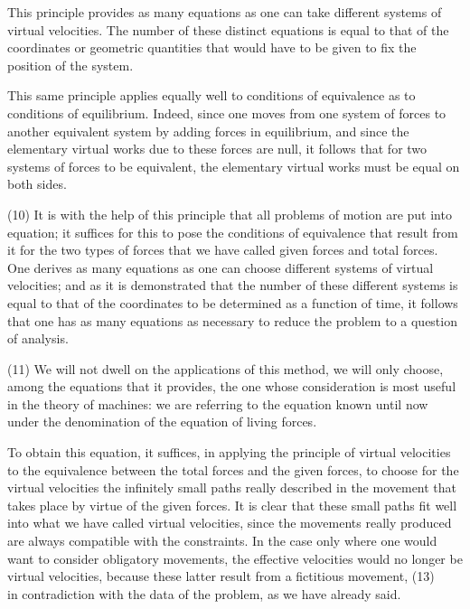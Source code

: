 \documentclass{book}
\begin{document}
This principle provides as many equations as one can take different systems of virtual velocities. The number of these distinct equations is equal to that of the coordinates or geometric quantities that would have to be given to fix the position of the system.

This same principle applies equally well to conditions of equivalence as to conditions of equilibrium. Indeed, since one moves from one system of forces to another equivalent system by adding forces in equilibrium, and since the elementary virtual works due to these forces are null, it follows that for two systems of forces to be equivalent, the elementary virtual works must be equal on both sides.

(10) It is with the help of this principle that all problems of motion are put into equation; it suffices for this to pose the conditions of equivalence that result from it for the two types of forces that we have called given forces and total forces. One derives as many equations as one can choose different systems of virtual velocities; and as it is demonstrated that the number of these different systems is equal to that of the coordinates to be determined as a function of time, it follows that one has as many equations as necessary to reduce the problem to a question of analysis.

(11) We will not dwell on the applications of this method, we will only choose, among the equations that it provides, the one whose consideration is most useful in the theory of machines: we are referring to the equation known until now under the denomination of the equation of living forces.

To obtain this equation, it suffices, in applying the principle of virtual velocities to the equivalence between the total forces and the given forces, to choose for the virtual velocities the infinitely small paths really described in the movement that takes place by virtue of the given forces. It is clear that these small paths fit well into what we have called virtual velocities, since the movements really produced are always compatible with the constraints. In the case only where one would want to consider obligatory movements, the effective velocities would no longer be virtual velocities, because these latter result from a fictitious movement, 
\newpage
(13)\\
in contradiction with the data of the problem, as we have already said.
\end{document}

